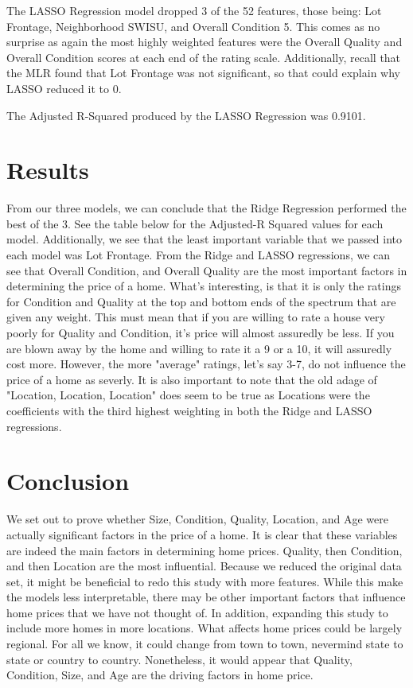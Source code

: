 \documentclass{article}
\begin{document}
	The LASSO Regression model dropped 3 of the 52 features, those being: Lot Frontage, Neighborhood SWISU, and Overall Condition 5. This comes as no surprise as again the most highly weighted features were the Overall Quality and Overall Condition scores at each end of the rating scale. Additionally, recall that the MLR found that Lot Frontage was not significant, so that could explain why LASSO reduced it to 0.

	The Adjusted R-Squared produced by the LASSO Regression was 0.9101.
	
	
	\section{Results}
	
	From our three models, we can conclude that the Ridge Regression performed the best of the 3. See the table below for the Adjusted-R Squared values for each model. Additionally, we see that the least important variable that we passed into each model was Lot Frontage.
	From the Ridge and LASSO regressions, we can see that Overall Condition, and Overall Quality are the most important factors in determining the price of a home. What's interesting, is that it is only the ratings for Condition and Quality at the top and bottom ends of the spectrum that are given any weight. This must mean that if you are willing to rate a house very poorly for Quality and Condition, it's price will almost assuredly be less. If you are blown away by the home and willing to rate it a 9 or a 10, it will assuredly cost more. However, the more "average" ratings, let's say 3-7, do not influence the price of a home as severly. It is also important to note that the old adage of "Location, Location, Location" does seem to be true as Locations were the coefficients with the third highest weighting in both the Ridge and LASSO regressions. 
	
	
	\section{Conclusion}

	We set out to prove whether Size, Condition, Quality, Location, and Age were actually significant factors in the price of a home. It is clear that these variables are indeed the main factors in determining home prices. Quality, then Condition, and then Location are the most influential. Because we reduced the original data set, it might be beneficial to redo this study with more features. While this make the models less interpretable, there may be other important factors that influence home prices that we have not thought of. In addition, expanding this study to include more homes in more locations. What affects home prices could be largely regional. For all we know, it could change from town to town, nevermind state to state or country to country. Nonetheless, it would appear that Quality, Condition, Size, and Age are the driving factors in home price. 
	
	
\end{document}
